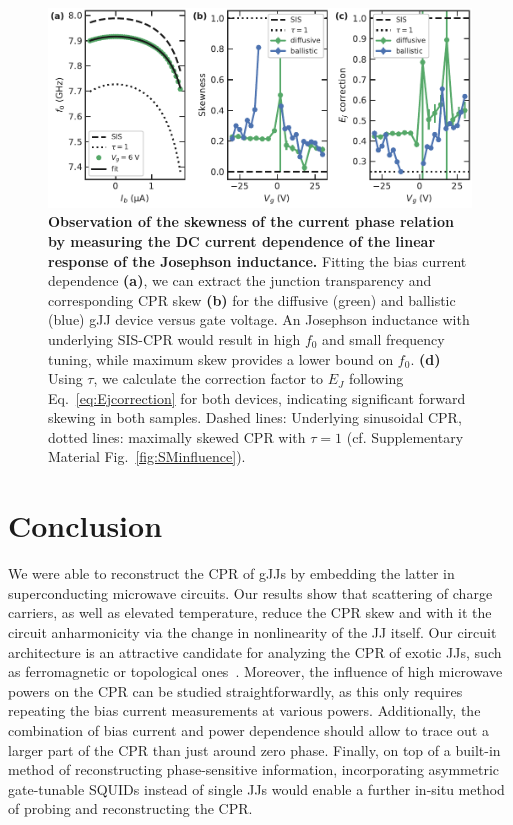 \begin{figure}[t]
	\centering
	\includegraphics[width=\linewidth]{chapter-gJJ-CPR/figs/Figure4}
	\caption{
		\textbf{Observation of the skewness of the current phase relation by measuring the DC current dependence of the linear response of the Josephson inductance.}
		Fitting the bias current dependence \textbf{(a)}, we can extract the junction transparency and corresponding CPR skew \textbf{(b)} for the diffusive (green) and ballistic (blue) gJJ device versus gate voltage.
		An Josephson inductance with underlying SIS-CPR would result in high $f_0$ and small frequency tuning, while maximum skew provides a lower bound on $f_0$.
		\textbf{(d)} Using $\tau$, we calculate the correction factor to $E_J$ following Eq.~\ref{eq:Ejcorrection} for both devices, indicating significant forward skewing in both samples.
		Dashed lines: Underlying sinusoidal CPR, dotted lines: maximally skewed CPR with $\tau=1$ (cf. Supplementary Material Fig.~\ref{fig:SMinfluence}).
	}
	\label{fig:figure4}
\end{figure}

\section{Conclusion}

We were able to reconstruct the CPR of gJJs by embedding the latter in superconducting microwave circuits.
%
Our results show that scattering of charge carriers, as well as elevated temperature, reduce the CPR skew and with it the circuit anharmonicity via the change in nonlinearity of the JJ itself.
%
Our circuit architecture is an attractive candidate for analyzing the CPR of exotic JJs, such as ferromagnetic or topological ones~\cite{golubovCurrentphaseRelationJosephson2004a,sochnikovNonsinusoidalCurrentPhaseRelationship2015,stoutimoreSecondHarmonicCurrentPhaseRelation2018,assoulineSpinOrbitInducedPhaseshift2019,muraniMicrowaveSignatureTopological2019}.
%
Moreover, the influence of high microwave powers on the CPR can be studied straightforwardly, as this only requires repeating the bias current measurements at various powers.
%
Additionally, the combination of bias current and power dependence should allow to trace out a larger part of the CPR than just around zero phase.
%
Finally, on top of a built-in method of reconstructing phase-sensitive information, incorporating asymmetric gate-tunable SQUIDs instead of single JJs would enable a further in-situ method of probing and reconstructing the CPR.

